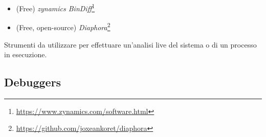 \begin{itemize}
\item (Free) \emph{zynamics BinDiff}\footnote{\url{https://www.zynamics.com/software.html}}

\item (Free, open-source) \emph{Diaphora}\footnote{\url{https://github.com/joxeankoret/diaphora}}
\end{itemize}


Strumenti da utilizzare per effettuare un'analisi live del sistema o di un processo in esecuzione.

\subsection{Debuggers}

\myindex{\olly}

